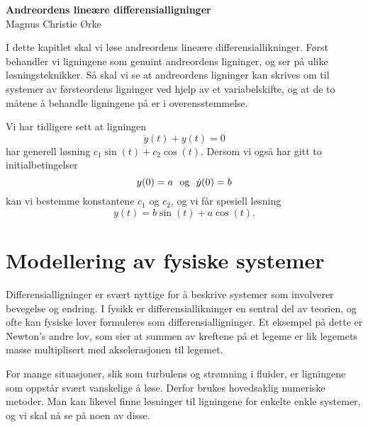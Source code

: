 \documentclass{article}
\theoremstyle{definition}
\theoremstyle{remark}
\newenvironment{ex}
{\pushQED{\qed}\renewcommand{\qedsymbol}{$\triangle$}\exx}
{\popQED\endexx}
\begin{document}
\begin{center}
    \large{\textbf{Andreordens lineære differensialligninger}}
    \\
    \normalsize{Magnus Christie Ørke}
\end{center}
\vspace{\baselineskip}

\begin{multicols*}{2}
I dette kapitlet skal vi løse andreordens lineære differensiallikninger. Først behandler vi ligningene som genuint andreordens ligninger, og ser på ulike løsningsteknikker. Så skal vi se at andreordens ligninger kan skrives om til systemer av førsteordens ligninger ved hjelp av et variabelskifte, og at de to måtene å behandle ligningene på er i overensstemmelse.

\begin{ex}
Vi har tidligere sett at ligningen
\begin{equation*}
    \ddot{y}(t) + y(t) = 0
\end{equation*}
har generell løsning $c_1 \sin(t) + c_2 \cos(t)$. Dersom vi også har gitt to initialbetingelser
\begin{equation*}
  y(0) = a \ \textnormal{ og } \ \dot{y}(0) = b
\end{equation*} kan vi bestemme konstantene $c_1$ og $c_2$, og vi får spesiell løsning
\begin{equation*}
  y(t) = b \sin(t) + a \cos(t).
\end{equation*}
\end{ex}


\section*{Modellering av fysiske systemer}
Differensialligninger er svært nyttige for å beskrive systemer som involverer bevegelse og endring. I fysikk er differensiallikninger en sentral del av teorien, og ofte kan fysiske lover formuleres som differensialligninger. Et eksempel på dette er Newton's andre lov, som sier at summen av kreftene på et legeme er lik legemets masse multiplisert med akselerasjonen til legemet.

For mange situasjoner, slik som turbulens og strømning i fluider, er ligningene som oppstår svært vanskelige å løse. Derfor brukes hovedsaklig numeriske metoder. Man kan likevel finne løsninger til ligningene for enkelte enkle systemer, og vi skal nå se på noen av disse.


\end{multicols*}
\end{document}
